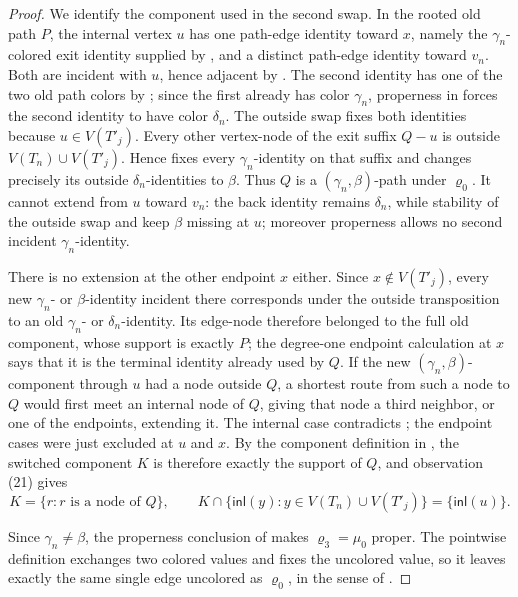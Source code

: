 \begin{proof}
We identify the component used in the second swap.  In the rooted old
path \(P\), the internal vertex \(u\) has one path-edge identity toward
\(x\), namely the \(\gamma_n\)-colored exit identity supplied by
, and a distinct path-edge
identity toward \(v_n\).  Both are incident with \(u\), hence adjacent
by .  The second identity has one of the two old
path colors by ; since the first already
has color \(\gamma_n\), properness in
 forces the second identity to have color
\(\delta_n\).  The outside swap fixes both identities because \(u\in
V(T'_j)\).  Every other vertex-node of the exit suffix \(Q-u\) is outside
\(V(T_n)\cup V(T'_j)\).  Hence
 fixes every \(\gamma_n\)-identity on that
suffix and changes precisely its outside \(\delta_n\)-identities to
\(\beta\).  Thus \(Q\) is a \((\gamma_n,\beta)\)-path under
\(\varrho_0\).  It cannot extend from \(u\) toward \(v_n\): the back
identity remains \(\delta_n\), while stability of the outside swap and
 keep \(\beta\) missing at \(u\); moreover
properness allows no second incident \(\gamma_n\)-identity.

There is no extension at the other endpoint \(x\) either.  Since
\(x\notin V(T'_j)\), every new \(\gamma_n\)- or \(\beta\)-identity
incident there corresponds under the outside transposition to an old
\(\gamma_n\)- or \(\delta_n\)-identity.  Its edge-node therefore belonged
to the full old component, whose support is exactly \(P\); the degree-one
endpoint calculation at \(x\) says that it is the terminal identity already
used by \(Q\).  If the new
\((\gamma_n,\beta)\)-component through \(u\) had a node outside \(Q\), a
shortest route from such a node to \(Q\) would first meet an internal node
of \(Q\), giving that node a third neighbor, or one of the endpoints,
extending it.  The internal case contradicts
; the endpoint cases were just
excluded at \(u\) and \(x\).  By the component definition in
, the switched component \(K\) is therefore
exactly the support of \(Q\), and observation (21) gives
\[
 K=\{r:r\text{ is a node of }Q\},\qquad
 K\cap\{\mathsf{inl}(y):y\in V(T_n)\cup V(T'_j)\}
     =\{\mathsf{inl}(u)\}.                                    \tag{9}
\]

Since \(\gamma_n\ne\beta\), the properness conclusion of
 makes \(\varrho_3=\mu_0\) proper.
The pointwise definition  exchanges two
colored values and fixes the uncolored value, so it leaves exactly the
same single edge uncolored as \(\varrho_0\), in the sense of
.


\end{proof}

